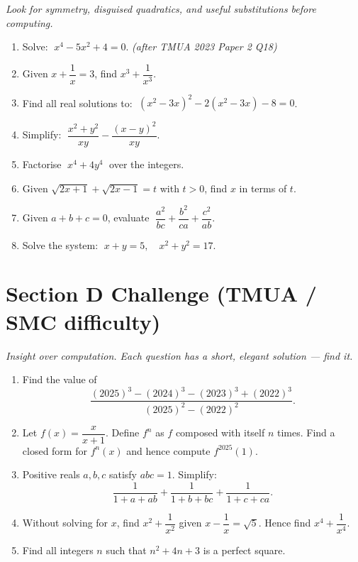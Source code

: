 \documentclass[11pt,a4paper]{article}
\begin{document}
\noindent\textit{Look for symmetry, disguised quadratics, and useful substitutions before computing.}

\begin{enumerate}

\item Solve: $\;x^4 - 5x^2 + 4 = 0$. \textit{\small(after TMUA 2023 Paper 2 Q18)}

\item Given $x + \dfrac{1}{x} = 3$, find $x^3 + \dfrac{1}{x^3}$.

\item Find all real solutions to: $\;(x^2 - 3x)^2 - 2(x^2-3x) - 8 = 0$.

\item Simplify: $\;\dfrac{x^2 + y^2}{xy} - \dfrac{(x-y)^2}{xy}$.

\item Factorise $\;x^4 + 4y^4\;$ over the integers.

\item Given $\sqrt{2x+1}+\sqrt{2x-1} = t$ with $t > 0$, find $x$ in terms of $t$.

\item Given $a + b + c = 0$, evaluate $\;\dfrac{a^2}{bc}+\dfrac{b^2}{ca}+\dfrac{c^2}{ab}$.

\item Solve the system: $\;x + y = 5,\quad x^2 + y^2 = 17$.

\end{enumerate}

\section*{Section D \quad Challenge \hfill{\normalfont\small(TMUA / SMC difficulty)}}

\noindent\textit{Insight over computation. Each question has a short, elegant solution --- find it.}

\begin{enumerate}

\item Find the value of
\[
  \frac{(2025)^3 - (2024)^3 - (2023)^3 + (2022)^3}{(2025)^2-(2022)^2}.
\]

\item Let $f(x) = \dfrac{x}{x+1}$. Define $f^n$ as $f$ composed with itself $n$ times.
      Find a closed form for $f^n(x)$ and hence compute $f^{2025}(1)$.

\item Positive reals $a, b, c$ satisfy $abc = 1$. Simplify:
\[
  \frac{1}{1+a+ab}+\frac{1}{1+b+bc}+\frac{1}{1+c+ca}.
\]

\item Without solving for $x$, find $x^2 + \dfrac{1}{x^2}$ given $x - \dfrac{1}{x} = \sqrt{5}$.
      Hence find $x^4 + \dfrac{1}{x^4}$.

\item Find all integers $n$ such that $n^2 + 4n + 3$ is a perfect square.

\end{enumerate}

\end{document}
